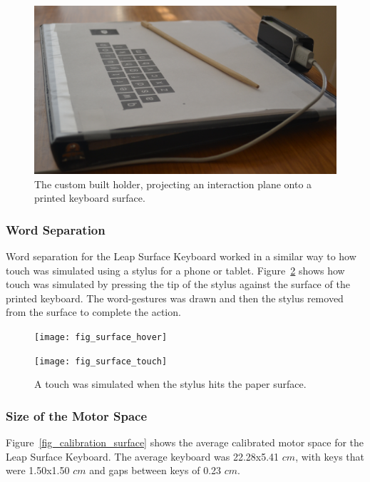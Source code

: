 \begin{figure}[h]
	\centering
	\includegraphics[width=5in]{fig_leap_holder}
	\caption[Leap Surface Holder]{The custom built holder, projecting an interaction plane onto a printed keyboard surface.}
	\label{fig_leap_holder}
\end{figure}

\subsubsection{Word Separation}
Word separation for the Leap Surface Keyboard worked in a similar way to how touch was simulated using a stylus for a phone or tablet. Figure~\ref{leap_surface_press_comparison} shows how touch was simulated by pressing the tip of the stylus against the surface of the printed keyboard. The word-gestures was drawn and then the stylus removed from the surface to complete the action.

\begin{figure}[h]
	\centering
	\begin{minipage}[t]{5.8in}
		\begin{minipage}[t]{2.85in}
			\texttt{[image: fig\_surface\_hover]}
		\end{minipage}
		\begin{minipage}[t]{2.9in}
			\texttt{[image: fig\_surface\_touch]}
		\end{minipage}
	\end{minipage}
	\caption[Leap Surface Word Separation]{A touch was simulated when the stylus hits the paper surface.}
	\label{leap_surface_press_comparison}
\end{figure}

\subsubsection{Size of the Motor Space}
Figure~\ref{fig_calibration_surface} shows the average calibrated motor space for the Leap Surface Keyboard. The average keyboard was 22.28x5.41 $cm$, with keys that were 1.50x1.50 $cm$ and gaps between keys of 0.23 $cm$.

